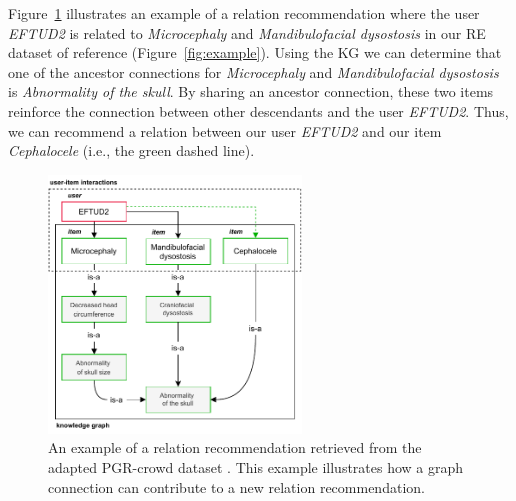 Figure~\ref{fig:pipeline} illustrates an example of a relation recommendation where the user \textit{EFTUD2} is related to \textit{Microcephaly} and \textit{Mandibulofacial dysostosis} in our RE dataset of reference (Figure~\ref{fig:example}). Using the KG we can determine that one of the ancestor connections for \textit{Microcephaly} and \textit{Mandibulofacial dysostosis} is \textit{Abnormality of the skull}. By sharing an ancestor connection, these two items reinforce the connection between other descendants and the user \textit{EFTUD2}. Thus, we can recommend a relation between our user \textit{EFTUD2} and our item \textit{Cephalocele} (i.e., the green dashed line).

\begin{figure}[!h]
\centerline{\includegraphics[width=0.6\textwidth]{images/chapter_4/paper_knowledge_graph.pdf}}
\caption[Example of a Relation Recommendation]{An example of a relation recommendation retrieved from the adapted PGR-crowd dataset \citep{sousa2020hybrid}. This example illustrates how a graph connection can contribute to a new relation recommendation.}
\label{fig:pipeline}
\end{figure}

